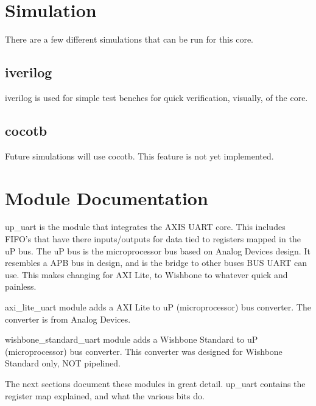 \newpage

\section{Simulation}
\par
There are a few different simulations that can be run for this core.

\subsection{iverilog}
\par
iverilog is used for simple test benches for quick verification, visually, of the core.

\subsection{cocotb}
\par
Future simulations will use cocotb. This feature is not yet implemented.

\newpage

\section{Module Documentation} \label{Module Documentation}

\par
up\_uart is the module that integrates the AXIS UART core.
This includes FIFO's that have there inputs/outputs for data tied to registers mapped in the uP bus.
The uP bus is the microprocessor bus based on Analog Devices design. It resembles a APB bus in design,
and is the bridge to other buses BUS UART can use. This makes changing for AXI Lite, to Wishbone to whatever
quick and painless.

\par
axi\_lite\_uart module adds a AXI Lite to uP (microprocessor) bus converter. The converter is
from Analog Devices.

\par
wishbone\_standard\_uart module adds a Wishbone Standard to uP (microprocessor) bus converter. This
converter was designed for Wishbone Standard only, NOT pipelined.

\vspace{15mm}
\par
The next sections document these modules in great detail. up\_uart contains the register map explained, and what the various bits do.

